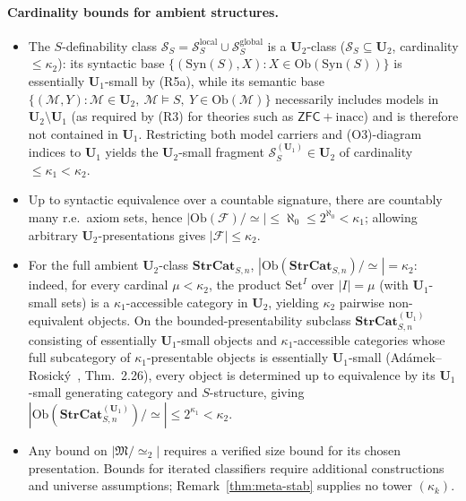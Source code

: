 \documentclass[11pt]{article}
\theoremstyle{plain}
\theoremstyle{definition}
\newcommand{\cS}{\mathcal{S}}
\newcommand{\cF}{\mathcal{F}}
\newcommand{\cM}{\mathcal{M}}
\newcommand{\fM}{\mathfrak{M}}
\newcommand{\Ob}{\mathrm{Ob}}
\newcommand{\Set}{\mathrm{Set}}
\newcommand{\Syn}{\mathrm{Syn}}
\newcommand{\ZFC}{\mathsf{ZFC}}
\begin{document}
\paragraph{Cardinality bounds for ambient structures.}
\begin{itemize}
\item The $S$-definability class $\cS_S = \cS_S^{\mathrm{local}} \cup \cS_S^{\mathrm{global}}$ is a $\mathbf{U}_2$-class ($\cS_S \subseteq \mathbf{U}_2$, cardinality $\le \kappa_2$): its syntactic base $\{(\Syn(S), X) : X \in \Ob(\Syn(S))\}$ is essentially $\mathbf{U}_1$-small by (R5a), while its semantic base $\{(\cM, Y) : \cM \in \mathbf{U}_2,\ \cM \models S,\ Y \in \Ob(\cM)\}$ necessarily includes models in $\mathbf{U}_2 \setminus \mathbf{U}_1$ (as required by (R3) for theories such as $\ZFC + \text{inacc}$) and is therefore not contained in $\mathbf{U}_1$. Restricting both model carriers and (O3)-diagram indices to $\mathbf{U}_1$ yields the $\mathbf{U}_2$-small fragment $\cS_S^{(\mathbf{U}_1)} \in \mathbf{U}_2$ of cardinality $\le \kappa_1 < \kappa_2$.
\item Up to syntactic equivalence over a countable signature, there are countably many r.e.\ axiom sets, hence $|\Ob(\cF)/\!\simeq| \leq \aleph_0 \le 2^{\aleph_0} < \kappa_1$; allowing arbitrary $\mathbf{U}_2$-presentations gives $|\cF| \leq \kappa_2$.
\item For the full ambient $\mathbf{U}_2$-class $\mathbf{StrCat}_{S, n}$, $|\Ob(\mathbf{StrCat}_{S, n})/\!\simeq| = \kappa_2$: indeed, for every cardinal $\mu < \kappa_2$, the product $\Set^I$ over $|I| = \mu$ (with $\mathbf{U}_1$-small sets) is a $\kappa_1$-accessible category in $\mathbf{U}_2$, yielding $\kappa_2$ pairwise non-equivalent objects. On the bounded-presentability subclass $\mathbf{StrCat}_{S, n}^{(\mathbf{U}_1)}$ consisting of essentially $\mathbf{U}_1$-small objects and $\kappa_1$-accessible categories whose full subcategory of $\kappa_1$-presentable objects is essentially $\mathbf{U}_1$-small (Ad\'amek--Rosick\'y~\cite{AdamekRosicky1994}, Thm.~2.26), every object is determined up to equivalence by its $\mathbf{U}_1$-small generating category and $S$-structure, giving $|\Ob(\mathbf{StrCat}_{S, n}^{(\mathbf{U}_1)})/\!\simeq| \leq 2^{\kappa_1} < \kappa_2$.
\item Any bound on $|\fM/\!\simeq_2|$ requires a verified size bound for its chosen presentation. Bounds for iterated classifiers require additional constructions and universe assumptions; Remark~\ref{thm:meta-stab} supplies no tower $(\kappa_k)$.
\end{itemize}
\end{document}
